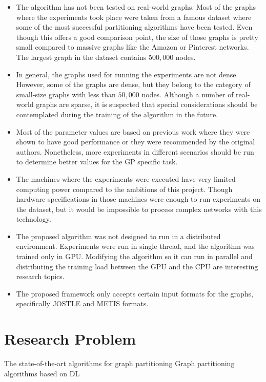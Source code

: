 \begin{itemize}
    \item The algorithm has not been tested on real-world graphs. Most of the graphs where the experiments took place were taken from a famous dataset where some of the most successful partitioning algorithms have been tested. Even though this offers a good comparison point, the size of those graphs is pretty small compared to massive graphs like the Amazon or Pinterest networks. The largest graph in the dataset contains $500,000$ nodes.
    \item In general, the graphs used for running the experiments are not dense. However, some of the graphs are dense, but they belong to the category of small-size graphs with less than $50,000$ nodes. Although a number of real-world graphs are sparse, it is suspected that special considerations should be contemplated during the training of the algorithm in the future.
    \item Most of the parameter values are based on previous work where they were shown to have good performance or they were recommended by the original authors. Nonetheless, more experiments in different scenarios should be run to determine better values for the GP specific task.
    \item The machines where the experiments were executed have very limited computing power compared to the ambitions of this project. Though hardware specifications in those machines were enough to run experiments on the dataset, but it would be impossible to process complex networks with this technology.
    \item The proposed algorithm was not designed to run in a distributed environment. Experiments were run in single thread, and the algorithm was trained only in GPU. Modifying the algorithm so it can run in parallel and distributing the training load between the GPU and the CPU are interesting research topics. 
    \item The proposed framework only accepts certain input formats for the graphs, specifically JOSTLE and METIS formats.
\end{itemize}

\section{Research Problem}
The state-of-the-art algorithms for graph partitioning 
Graph partitioning algorithms based on DL

